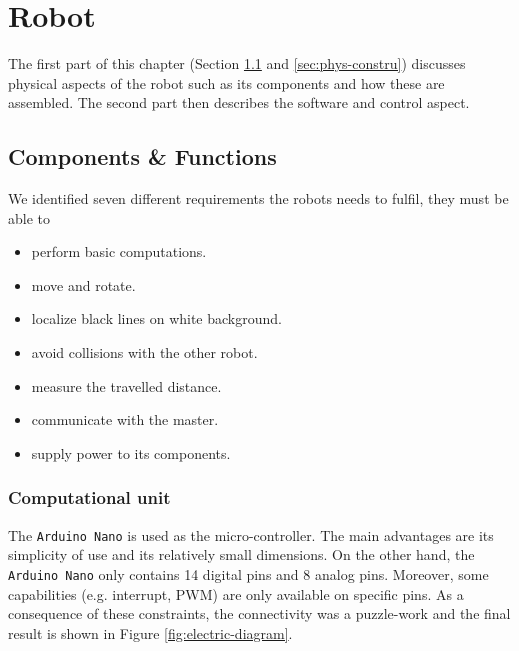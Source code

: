 \documentclass[12pt]{report}
\begin{document}


\chapter{Robot}\label{chapter-construction}
The first part of this chapter (Section \ref{sec:components} and \ref{sec:phys-constru}) discusses physical aspects of the robot such as its components and how these are assembled. The second part then describes the software and control aspect.

\section{Components \& Functions}\label{sec:components}
We identified seven different requirements the robots needs to fulfil, they must be able to 
\begin{itemize}
\item perform basic computations.
\item move and rotate.
\item localize black lines on white background.
\item avoid collisions with the other robot.
\item measure the travelled distance.
\item communicate with the master.
\item supply power to its components.
\end{itemize}

\subsection*{Computational unit}
The \texttt{Arduino Nano} is used as the micro-controller. The main advantages are its simplicity of use and its relatively small dimensions. On the other hand, the \texttt{Arduino Nano} only contains 14 digital pins and 8 analog pins. Moreover, some capabilities (e.g. interrupt, PWM) are only available on specific pins. As a consequence of these constraints, the connectivity was a puzzle-work and the final result is shown in Figure \ref{fig:electric-diagram}.
\end{document}
